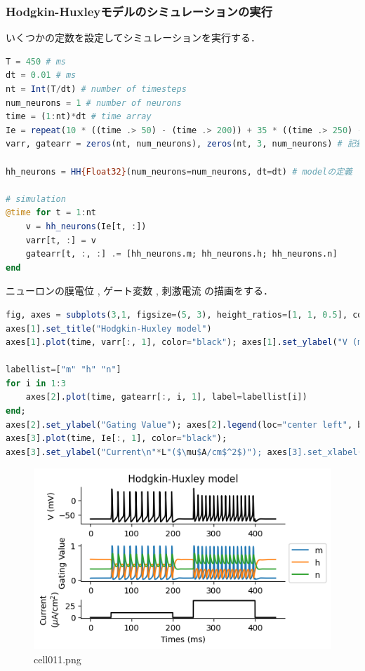 \subsubsection{Hodgkin-Huxleyモデルのシミュレーションの実行}
いくつかの定数を設定してシミュレーションを実行する．
\begin{lstlisting}[language=julia]
T = 450 # ms
dt = 0.01 # ms
nt = Int(T/dt) # number of timesteps
num_neurons = 1 # number of neurons
time = (1:nt)*dt # time array
Ie = repeat(10 * ((time .> 50) - (time .> 200)) + 35 * ((time .> 250) - (time .> 400)), 1, num_neurons)  # injection current
varr, gatearr = zeros(nt, num_neurons), zeros(nt, 3, num_neurons) # 記録用

hh_neurons = HH{Float32}(num_neurons=num_neurons, dt=dt) # modelの定義

# simulation
@time for t = 1:nt
    v = hh_neurons(Ie[t, :])
    varr[t, :] = v
    gatearr[t, :, :] .= [hh_neurons.m; hh_neurons.h; hh_neurons.n]
end
\end{lstlisting}
ニューロンの膜電位 , ゲート変数 , 刺激電流 の描画をする．
\begin{lstlisting}[language=julia]
fig, axes = subplots(3,1, figsize=(5, 3), height_ratios=[1, 1, 0.5], constrained_layout=true) 
axes[1].set_title("Hodgkin-Huxley model")
axes[1].plot(time, varr[:, 1], color="black"); axes[1].set_ylabel("V (mV)")

labellist=["m" "h" "n"] 
for i in 1:3
    axes[2].plot(time, gatearr[:, i, 1], label=labellist[i])
end; 
axes[2].set_ylabel("Gating Value"); axes[2].legend(loc="center left", bbox_to_anchor=(1, 0.5))
axes[3].plot(time, Ie[:, 1], color="black"); 
axes[3].set_ylabel("Current\n"*L"($\mu$A/cm$^2$)"); axes[3].set_xlabel("Times (ms)")
\end{lstlisting}
\begin{figure}[ht]
	\centering
	\includegraphics[scale=0.8, max width=\linewidth]{./fig/neuron-model/hodgkin-huxley/cell011.png}
	\caption{cell011.png}
	\label{cell011.png}
\end{figure}
